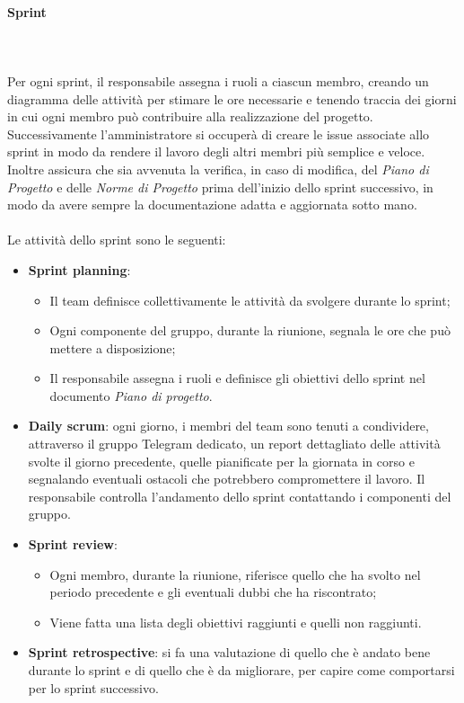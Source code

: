 \paragraph*{Sprint}\label{inf:sprint} ~\\\\ Per ogni sprint, il responsabile
assegna i ruoli a ciascun membro, creando un diagramma delle attività per
stimare le ore necessarie e tenendo traccia dei giorni in cui ogni membro può
contribuire alla realizzazione del progetto. Successivamente l'amministratore
si occuperà di creare le issue associate allo sprint in modo da rendere il
lavoro degli altri membri più semplice e veloce. Inoltre assicura che sia
avvenuta la verifica, in caso di modifica, del \textit{Piano di Progetto} e
delle \textit{Norme di Progetto} prima dell'inizio dello sprint successivo, in
modo da avere sempre la documentazione adatta e aggiornata sotto mano.\\\\ Le
attività dello sprint sono le seguenti:
\begin{itemize}
    \item \textbf{Sprint planning}:
          \begin{itemize}
              \item Il team definisce collettivamente le attività da svolgere durante lo sprint;
              \item Ogni componente del gruppo, durante la riunione, segnala le ore che può mettere
                    a disposizione;
              \item Il responsabile assegna i ruoli e definisce gli obiettivi dello sprint nel
                    documento \textit{Piano di progetto}.
          \end{itemize}
    \item \textbf{Daily scrum}: ogni giorno, i membri del team sono tenuti a condividere, attraverso il gruppo Telegram dedicato,
          un report dettagliato delle attività svolte il giorno precedente,
          quelle pianificate per la giornata in corso e segnalando eventuali ostacoli che potrebbero compromettere il lavoro.
          Il responsabile controlla l'andamento dello sprint contattando i componenti del gruppo.
    \item \textbf{Sprint review}:
          \begin{itemize}
              \item Ogni membro, durante la riunione, riferisce quello che ha svolto nel periodo
                    precedente e gli eventuali dubbi che ha riscontrato;
              \item Viene fatta una lista degli obiettivi raggiunti e quelli non raggiunti.
          \end{itemize}
    \item \textbf{Sprint retrospective}: si fa una valutazione di quello che è andato bene durante lo sprint e di
          quello che è da migliorare, per capire come comportarsi per lo sprint successivo.
\end{itemize}


